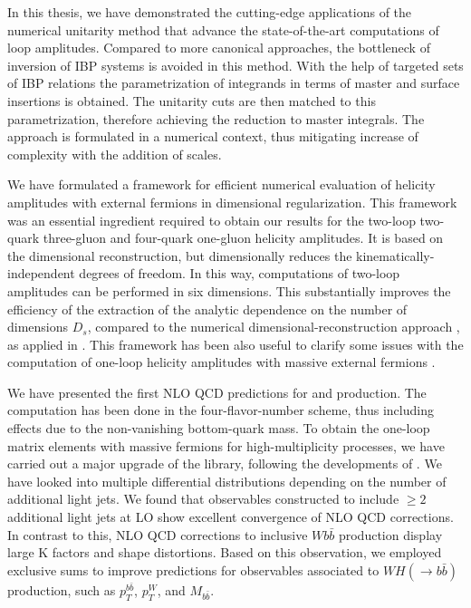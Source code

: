 In this thesis, we have demonstrated the cutting-edge applications of the numerical unitarity method \cite{Abreu:2017hqn,Abreu:2017idw,Abreu:2017xsl,Ita:2015tya,Ellis:2008ir,Ellis:2007br,Giele:2008ve}
that advance the state-of-the-art computations of loop amplitudes.
Compared to more canonical approaches, the bottleneck of inversion of IBP systems is avoided in this method.
With the help of targeted sets of IBP relations \citep{Gluza:2010ws,Abreu:2017hqn}
the parametrization of integrands in terms of master and surface insertions is obtained.
The unitarity cuts are then matched to this parametrization, therefore achieving the reduction to master integrals.
The approach is formulated in a numerical context, thus mitigating increase of complexity with the addition of scales.

We have formulated a framework for efficient numerical evaluation of helicity amplitudes with external fermions in dimensional regularization.
This framework was an essential ingredient required to obtain our results for the two-loop 
two-quark three-gluon and four-quark one-gluon helicity amplitudes.
It is based on the dimensional reconstruction, but dimensionally
reduces the kinematically-independent degrees of freedom.
In this way, computations of two-loop amplitudes can be performed in six dimensions.
This substantially improves the efficiency of the extraction of the analytic dependence on the
number of dimensions $D_s$, compared to the numerical dimensional-reconstruction approach \cite{Giele:2008ve,Ellis:2008ir, Boughezal:2011br}, as applied
in \cite{Abreu:2017xsl,Abreu:2017hqn,Badger:2018gip,Abreu:2018jgq}.
This framework has been also useful to clarify some issues with the computation of one-loop helicity amplitudes
with massive external fermions \cite{Anger:2018ove}.

We have presented the first NLO QCD predictions for \Wbbjj{} and \Wbbjjj{} production.
The computation has been done in the four-flavor-number scheme, thus including effects due to the non-vanishing bottom-quark mass.
To obtain the one-loop matrix elements with massive fermions for high-multiplicity processes,
we have carried out a major upgrade of the \BlackHat{} library, following the developments of \cite{Ellis:2008ir}.
We have looked into multiple differential distributions depending on the number of additional light jets.
We found that observables constructed to include $\geq2$ additional light jets at LO
show excellent convergence of NLO QCD corrections.
In contrast to this, NLO QCD corrections to inclusive $Wb\bar{b}$ production display large K factors and shape distortions.
Based on this observation, we employed exclusive sums to improve predictions for observables associated to $WH(\rightarrow b{\bar b})$
production, such as $p_T^{b\bar b}$, $p_T^W$, and $M_{b\bar b}$.

